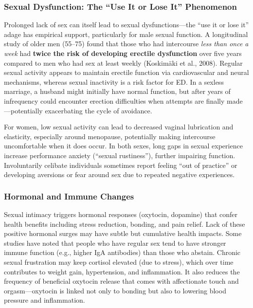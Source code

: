 \documentclass[12pt, letterpaper]{article}
\begin{document}
\subsubsection{Sexual Dysfunction: The ``Use It or Lose It'' Phenomenon}

Prolonged lack of sex can itself lead to sexual dysfunctions---the ``use it or lose it'' adage has empirical support, particularly for male sexual function. A longitudinal study of older men (55--75) found that those who had intercourse \textit{less than once a week} had \textbf{twice the risk of developing erectile dysfunction} over five years compared to men who had sex at least weekly (Koskimäki et al., 2008). Regular sexual activity appears to maintain erectile function via cardiovascular and neural mechanisms, whereas sexual inactivity is a risk factor for ED. In a sexless marriage, a husband might initially have normal function, but after years of infrequency could encounter erection difficulties when attempts are finally made---potentially exacerbating the cycle of avoidance.

For women, low sexual activity can lead to decreased vaginal lubrication and elasticity, especially around menopause, potentially making intercourse uncomfortable when it does occur. In both sexes, long gaps in sexual experience increase performance anxiety (``sexual rustiness''), further impairing function. Involuntarily celibate individuals sometimes report feeling ``out of practice'' or developing aversions or fear around sex due to repeated negative experiences.

\subsubsection{Hormonal and Immune Changes}

Sexual intimacy triggers hormonal responses (oxytocin, dopamine) that confer health benefits including stress reduction, bonding, and pain relief. Lack of these positive hormonal surges may have subtle but cumulative health impacts. Some studies have noted that people who have regular sex tend to have stronger immune function (e.g., higher IgA antibodies) than those who abstain. Chronic sexual frustration may keep cortisol elevated (due to stress), which over time contributes to weight gain, hypertension, and inflammation. It also reduces the frequency of beneficial oxytocin release that comes with affectionate touch and orgasm---oxytocin is linked not only to bonding but also to lowering blood pressure and inflammation.
\end{document}
